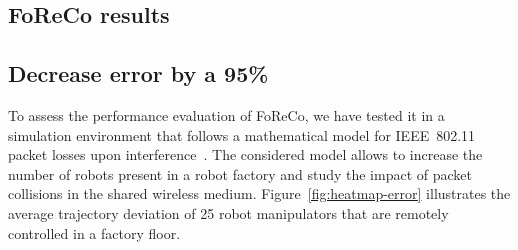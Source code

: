 \documentclass[a0,portrait]{a0poster}
\begin{document}
\begin{multicols}{2}


\color{DarkSlateGray} %


\section*{FoReCo results}
\subsection*{Decrease error by a 95\%}
To assess the performance evaluation of FoReCo,
we have tested it in a simulation environment that
follows a mathematical model for IEEE~802.11 packet
losses upon interference~\cite{foreco}.
The considered model allows
to increase the number of robots present in a robot
factory and study the impact of packet collisions in
the shared wireless medium.
Figure~\ref{fig:heatmap-error} illustrates the average
trajectory deviation of 25 robot manipulators that
are remotely controlled in a factory floor.


\end{multicols}
\end{document}
